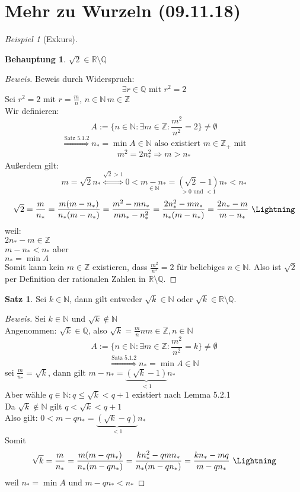 \documentclass[12pt,a4paper,titlepage]{article} %
\theoremstyle{definition}
\newtheorem{satz}{Satz}[subsection]
\newtheorem*{beh}{Behauptung}
\theoremstyle{remark}
\newtheorem*{bsp}{Beispiel}
\newenvironment{bew}{\begin{proof}[Beweis]}{\end{proof}}
\newcommand{\N}{\mathbb{N}}
\newcommand{\Z}{\mathbb{Z}}
\newcommand{\Q}{\mathbb{Q}}
\newcommand{\R}{\mathbb{R}}
\begin{document}
	\section{Mehr zu Wurzeln (09.11.18)}
	\begin{bsp} [Exkurs]
		\begin{beh}
			\(\sqrt{2} \in \R \setminus \Q\)
		\end{beh}
		\begin{bew}
			Beweis durch Widerspruch:
			\[\exists r \in \Q \text{ mit } r^2 = 2\]
			Sei \(r^2 = 2\) mit \(r = \frac{m}{n}\), \(n \in \N\, m \in \Z\)\\
			Wir definieren:
			\[A := \{n \in \N: \exists m \in \Z: \frac{m^2}{n^2} = 2\} \neq \emptyset\]
			\[\overset{\text{Satz 5.1.2}}{\Rightarrow} n_* = \min A \in \N \text{ also existiert } m \in \Z_+ \text{ mit}\]
			\[m^2 = 2n_*^2 \Rightarrow m > n_* \]
			Außerdem gilt:
			\[m = \sqrt{2}n_* \overset{\sqrt{2} > 1}{\Leftrightarrow} 0 < \underset{\in \N}{m - n_*} = \underset{> 0 \text{ und } < 1}{(\sqrt{2} - 1)}n_* < n_*\]
			\[\sqrt{2} = \frac{m}{n_*} = \frac{m(m - n_*)}{n_*(m - n_*)} = \frac{m^2 - mn_*}{mn_* - n_*^2} = \frac{2n_*^2 - mn_*}{n_*(m-n_*)} = \frac{2n_*-m}{m-n_*} \text{ \Lightning}\]
			weil:\\
			\(2n_* - m \in \Z\)\\
			\(m - n_* < n_*\) aber\\
			\(n_* = \min A\)\\
			Somit kann kein \(m \in \Z\) existieren, dass \(\frac{m^2}{n^2} = 2\) für beliebiges \(n \in \N\). Also ist \(\sqrt{2}\) per Definition der rationalen Zahlen in \(\R \setminus \Q\).
		\end{bew}
		\begin{satz}
			Sei \(k \in \N\), dann gilt entweder \(\sqrt{k} \in \N\) oder \(\sqrt{k} \in \R \setminus \Q\).
		\end{satz}
		\begin{bew}
			Sei \(k \in \N\) und \(\sqrt{k} \not\in \N\)\\
			Angenommen: \(\sqrt{k} \in \Q\), also \(\sqrt{k} = \frac{m}{n}n m \in \Z, n \in \N\)\\
			\[A := \{n \in \N: \exists m \in \Z: \frac{m^2}{n^2} = k\} \neq \emptyset\]
			\[\overset{\text{Satz 5.1.2}}{\Rightarrow} n_* = \min A \in \N\]
			sei \(\frac{m}{n_*} = \sqrt{k}\), dann gilt \(m - n_* = \underbrace{(\sqrt{k}-1)}_{<1}n_*\)\\
			Aber wähle \(q \in \N: q \leq \sqrt{k} < q + 1\) existiert nach Lemma 5.2.1\\
			Da \(\sqrt{k} \not \in \N\) gilt \(q < \sqrt{k} < q + 1\)\\
			Also gilt: \(0 < m - qn_* = \underbrace{(\sqrt{k}-q)}_{<1}n_*\)\\
			Somit
			\[\sqrt{k} = \frac{m}{n_*} = \frac{m(m - qn_*)}{n_*(m - qn_*)} = \frac{kn_*^2 - qmn_*}{n_*(m-qn_*)} = \frac{kn_* - mq}{m - qn_*} \text{ \Lightning}\]
			weil \(n_* = \min A\) und \(m - qn_* < n_*\)
		\end{bew}
	\end{bsp}
\end{document}
